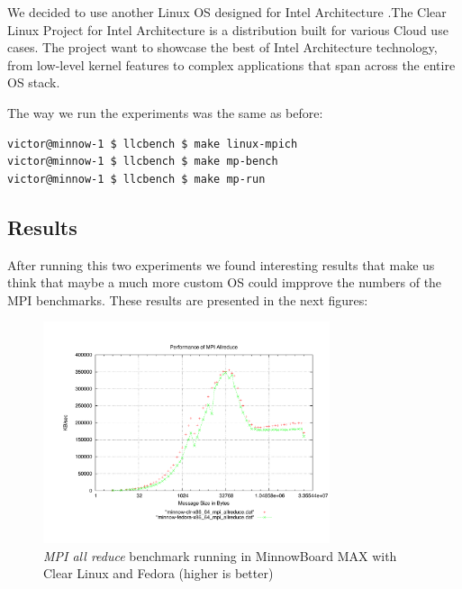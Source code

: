 We decided to use another Linux OS designed for Intel Architecture
\cite{clear-linux}.The Clear Linux Project for Intel Architecture is a
distribution built for various Cloud use cases. The project  want to showcase
the best of Intel Architecture technology, from low-level kernel features to
complex applications that span across the entire OS stack.

The way we run the experiments was the same as before: 

\begin{minipage}{\textwidth}
\end{minipage}

\begin{minipage}{\textwidth}
\begin{lstlisting}[frame=single]
victor@minnow-1 $ llcbench $ make linux-mpich
victor@minnow-1 $ llcbench $ make mp-bench
victor@minnow-1 $ llcbench $ make mp-run
\end{lstlisting}
\end{minipage}

\subsection{Results}

After running this two experiments we found interesting results that make us
think that maybe a much more custom OS could impprove the numbers of the MPI
benchmarks. These results are presented in the next figures:

\begin{figure}[H]
\centering
\includegraphics[width=0.75\textwidth]{images/mpbench_clr_experiments/mpi_allreduce.pdf}
\caption{\textit{MPI all reduce} benchmark running in MinnowBoard MAX with Clear Linux and
Fedora (higher is better)}
\label{mpi_allreduce_clr_fedora}
\end{figure}

